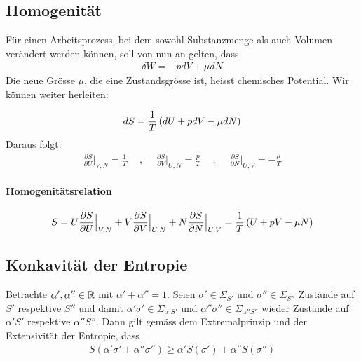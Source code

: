 \subsection{Homogenität}

Für einen Arbeitsprozess, bei dem sowohl Substanzmenge als auch Volumen
verändert werden können, soll von nun an gelten, dass
\begin{align*}
    \delta W = - p dV + \mu d N
\end{align*}
Die neue Grösse $\mu$, die eine Zustandsgrösse ist, heisst chemisches Potential.
Wir können weiter herleiten:

\begin{align*}
    dS = \frac{1}{T} \left( dU + p dV - \mu dN \right)
\end{align*}
Daraus folgt:
\begin{align*}
    \frac{\partial S}{\partial U} \Big|_{V,N} = \frac{1}{T}
    \hspace{15pt} , \hspace{15pt}
    \frac{\partial S}{\partial V} \Big|_{U,N} = \frac{p}{T}
    \hspace{15pt} , \hspace{15pt}
    \frac{\partial S}{\partial N} \Big|_{U,V} = - \frac{\mu}{T}
\end{align*}

\paragraph{Homogenitätsrelation}
\begin{align*}
    S = U \frac{\partial S}{\partial U} \Big|_{V,N} +
        V \frac{\partial S}{\partial V} \Big|_{U,N} +
        N \frac{\partial S}{\partial N} \Big|_{U,V}
    = \frac{1}{T} \left( U + p V - \mu N \right)
\end{align*}


\subsection{Konkavität der Entropie}

Betrachte $\alpha',\alpha'' \in \mathbb{R}$ mit $\alpha' + \alpha'' = 1$. Seien
$\sigma' \in \Sigma_{S'}$ und $\sigma'' \in \Sigma_{S''}$ Zustände auf $S'$
respektive $S''$ und damit $\alpha' \sigma' \in \Sigma_{\alpha' S'}$ und
$\alpha'' \sigma'' \in \Sigma_{\alpha'' S''}$ wieder Zustände auf $\alpha' S'$
respektive $\alpha'' S''$. Dann gilt gemäss dem Extremalprinzip und der
Extensivität der Entropie, dass
\begin{align*}
    S(\alpha' \sigma' + \alpha'' \sigma'') \geq
    \alpha' S(\sigma') + \alpha'' S(\sigma'')
\end{align*}

